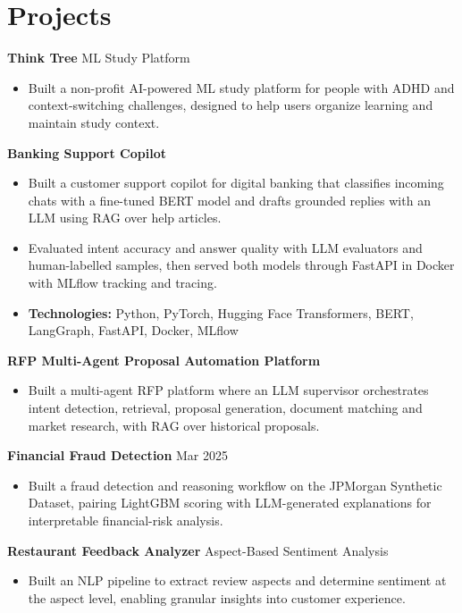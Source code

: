 \documentclass[10pt,a4paper]{article}
\begin{document}
\section{Projects}
\textbf{Think Tree} \textbar{} ML Study Platform\par
\begin{itemize}
  \item Built a non-profit AI-powered ML study platform for people with ADHD and context-switching challenges, designed to help users organize learning and maintain study context.
\end{itemize}
\textbf{Banking Support Copilot}\par
\begin{itemize}
  \item Built a customer support copilot for digital banking that classifies incoming chats with a fine-tuned BERT model and drafts grounded replies with an LLM using RAG over help articles.
  \item Evaluated intent accuracy and answer quality with LLM evaluators and human-labelled samples, then served both models through FastAPI in Docker with MLflow tracking and tracing.
  \item \textbf{Technologies:} Python, PyTorch, Hugging Face Transformers, BERT, LangGraph, FastAPI, Docker, MLflow
\end{itemize}
\textbf{RFP Multi-Agent Proposal Automation Platform}\par
\begin{itemize}
  \item Built a multi-agent RFP platform where an LLM supervisor orchestrates intent detection, retrieval, proposal generation, document matching and market research, with RAG over historical proposals.
\end{itemize}
\textbf{Financial Fraud Detection} \textbar{} Mar 2025\par
\begin{itemize}
  \item Built a fraud detection and reasoning workflow on the JPMorgan Synthetic Dataset, pairing LightGBM scoring with LLM-generated explanations for interpretable financial-risk analysis.
\end{itemize}
\textbf{Restaurant Feedback Analyzer} \textbar{} Aspect-Based Sentiment Analysis\par
\begin{itemize}
  \item Built an NLP pipeline to extract review aspects and determine sentiment at the aspect level, enabling granular insights into customer experience.
\end{itemize}
\end{document}
